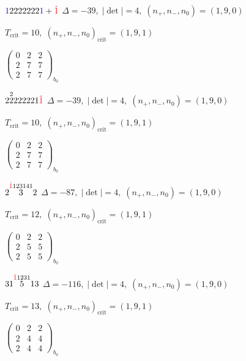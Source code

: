 \documentclass[10pt]{article}
\begin{document}
$\textcolor{blue}{1}2222222\textcolor{blue}{1}+\textcolor{red}{\hat{1}}$ \quad $\Delta=-39,\; |\det|=4,\; (n_+,n_-,n_0)=(1,9,0)$

\hspace{1em}$T_{\text{crit}}=10,\; (n_+,n_-,n_0)_{\text{crit}}=(1,9,1)$

\hspace{2em}$\left(\begin{smallmatrix}0 & 2 & 2 \\ 2 & 7 & 7 \\ 2 & 7 & 7\end{smallmatrix}\right)_{\!b_0}$

\smallskip

$2\overset{2}{2}222221\textcolor{red}{\hat{1}}$ \quad $\Delta=-39,\; |\det|=4,\; (n_+,n_-,n_0)=(1,9,0)$

\hspace{1em}$T_{\text{crit}}=10,\; (n_+,n_-,n_0)_{\text{crit}}=(1,9,1)$

\hspace{2em}$\left(\begin{smallmatrix}0 & 2 & 2 \\ 2 & 7 & 7 \\ 2 & 7 & 7\end{smallmatrix}\right)_{\!b_0}$

\smallskip

$2\overset{\textcolor{red}{\hat{1}}123141}{3}2$ \quad $\Delta=-87,\; |\det|=4,\; (n_+,n_-,n_0)=(1,9,0)$

\hspace{1em}$T_{\text{crit}}=12,\; (n_+,n_-,n_0)_{\text{crit}}=(1,9,1)$

\hspace{2em}$\left(\begin{smallmatrix}0 & 2 & 2 \\ 2 & 5 & 5 \\ 2 & 5 & 5\end{smallmatrix}\right)_{\!b_0}$

\smallskip

$31\overset{\textcolor{red}{\hat{1}}1231}{5}13$ \quad $\Delta=-116,\; |\det|=4,\; (n_+,n_-,n_0)=(1,9,0)$

\hspace{1em}$T_{\text{crit}}=13,\; (n_+,n_-,n_0)_{\text{crit}}=(1,9,1)$

\hspace{2em}$\left(\begin{smallmatrix}0 & 2 & 2 \\ 2 & 4 & 4 \\ 2 & 4 & 4\end{smallmatrix}\right)_{\!b_0}$
\end{document}
